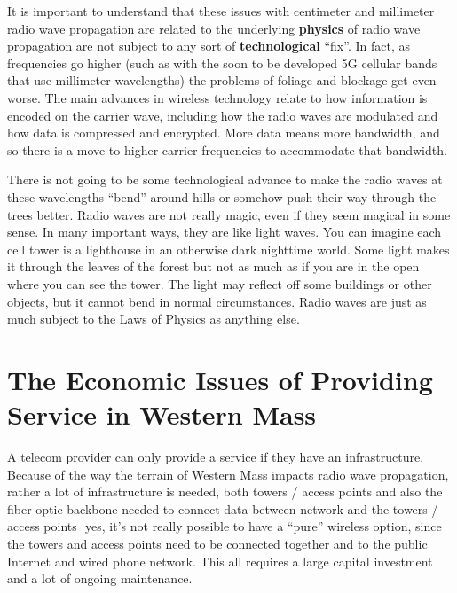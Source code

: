 \documentclass[12pt]{article}
\begin{document}
It is important to understand that these issues with centimeter and millimeter
radio wave propagation are related to the underlying \textbf{physics} of radio
wave propagation are not subject to any sort of \textbf{technological}
``fix''. In fact, as frequencies go higher (such as with the soon to be
developed 5G cellular bands that use millimeter wavelengths) the problems of
foliage and blockage get even worse. The main advances in wireless technology
relate to how information is encoded on the carrier wave, including how the
radio waves are modulated and how data is compressed and encrypted. More data
means more bandwidth, and so there is a move to higher carrier frequencies to
accommodate that bandwidth.

There is not going to be some technological advance to make the radio waves at
these wavelengths ``bend'' around hills or somehow push their way through the
trees better. Radio waves are not really magic, even if they seem magical in
some sense. In many important ways, they are like light waves. You can imagine
each cell tower is a lighthouse in an otherwise dark nighttime world. Some
light makes it through the leaves of the forest but not as much as if you are
in the open where you can see the tower. The light may reflect off some
buildings or other objects, but it cannot bend in normal circumstances. Radio
waves are just as much subject to the Laws of Physics as anything else.

\section{The Economic Issues of Providing Service in Western Mass}

A telecom provider can only provide a service if they have an infrastructure.
Because of the way the terrain of Western Mass impacts radio wave propagation,
rather a lot of infrastructure is needed, both towers / access points and also
the fiber optic backbone needed to connect data between network and the towers
/ access points ­ yes, it's not really possible to have a ``pure'' wireless
option, since the towers and access points need to be connected together and
to the public Internet and wired phone network. This all requires a large
capital investment and a lot of ongoing maintenance.
\end{document}
